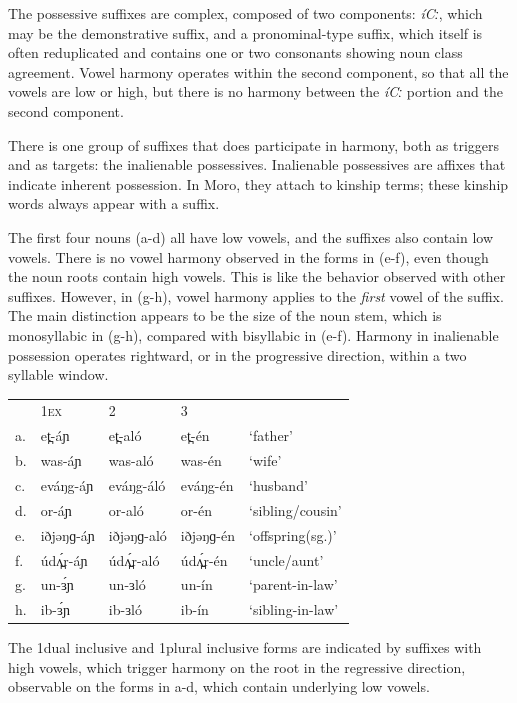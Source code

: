 The possessive suffixes are complex, composed of two components: \textit{íCː}, which may be the demonstrative suffix, and a pronominal-type suffix, which itself is often reduplicated and contains one or two consonants showing noun class agreement. Vowel harmony operates within the second component, so that all the vowels are low or high, but there is no harmony between the \textit{íCː} portion and the second component.

There is one group of suffixes that does participate in harmony, both as triggers and as targets: the inalienable possessives. Inalienable possessives are affixes that indicate inherent possession. In Moro, they attach to kinship terms; these kinship words always appear with a suffix. 

The first four nouns (a-d) all have low vowels, and the suffixes also contain low vowels. There is no vowel harmony observed in the forms in (e-f), even though the noun roots contain high vowels. This is like the behavior observed with other suffixes. However, in (g-h), vowel harmony applies to the \textit{first} vowel of the suffix. The main distinction appears to be the size of the noun stem, which is monosyllabic in (g-h), compared with bisyllabic in (e-f). Harmony in inalienable possession operates rightward, or in the progressive direction, within a two syllable window. 

\ea
\begin{tabular}[t]{lllll}
&	1\textsc{ex}	&	2	&	3\\
a.	&	et̪-áɲ	&	et̪-aló	&	et̪-én	&	‘father’\\
b.	&	was-áɲ	&	was-aló	&	was-én	&	‘wife’\\
c.	&	eváŋg-áɲ	&	eváŋg-áló	&	eváŋg-én	&	‘husband’\\
d.	&	or-áɲ	&	or-aló	&	or-én	&	‘sibling/cousin’\\
e.	&	iðjəŋɡ-áɲ	&	iðjəŋɡ-aló	&	iðjəŋɡ-én	&	‘offspring(sg.)’\\
f.	&	údʌ̪́r-áɲ	&	údʌ̪́r-aló	&	údʌ̪́r-én	&	‘uncle/aunt’\\
g.	&	un-ɜ́ɲ	&	un-ɜló	&	un-ín	&	‘parent-in-law’\\
h.	&	ib-ɜ́ɲ	&	ib-ɜló	&	ib-ín	&	‘sibling-in-law’\\
\end{tabular}
\z

The 1dual inclusive and 1plural inclusive forms are indicated by suffixes with high vowels, which trigger harmony on the root in the regressive direction, observable on the forms in a-d, which contain underlying low vowels.

